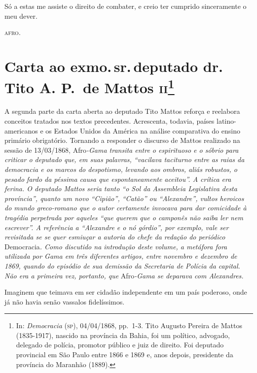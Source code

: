 Só a estas me assiste o direito de combater, e creio ter cumprido
sinceramente o meu dever.
\begin{flushright}
\textsc{afro}.
\end{flushright}
\chapter{Carta ao exmo.\,sr.\,deputado dr.\,Tito A. P.~de Mattos
\textsc{ii}\footnote{In: \emph{Democracia} (\textsc{sp}), 04/04/1868, pp.~1-3.
  Tito Augusto Pereira de Mattos (1835-1917), nascido na província da
  Bahia, foi um político, advogado, delegado de polícia, promotor
  público e juiz de direito. Foi deputado provincial em São Paulo entre
  1866 e 1869 e, anos depois, presidente da província do Maranhão
  (1889).}}

\begin{didascalia}
A segunda parte da carta aberta ao deputado Tito Mattos reforça e
reelabora conceitos tratados nos textos precedentes. Acrescenta,
todavia, países latino-americanos e os Estados Unidos da América na
análise comparativa do ensino primário obrigatório. Tornando a responder
o discurso de Mattos realizado na sessão de 13/03/1868, Afro\emph{-Gama
transita entre o espirituoso e o sóbrio para criticar o deputado que, em
suas palavras, ``vacilava taciturno entre as raias da democracia e
os marcos do despotismo, levando aos ombros, aliás robustos, o pesado
fardo da péssima causa que espontaneamente aceitou''. A crítica era
ferina. O deputado Mattos seria tanto ``o Sol da Assembleia Legislativa
desta província'', quanto um novo ``Cipião'', ``Catão'' ou ``Alexandre'',
vultos heroicos do mundo greco-romano que o autor certamente invocava
para dar comicidade à tragédia perpetrada por aqueles ``que querem que o
camponês não saiba ler nem escrever''. A referência a ``Alexandre e o nó
górdio'', por exemplo, vale ser revisitada se se quer esmiuçar a autoria
do chefe da redação do periódico} Democracia\emph{. Como discutido na
introdução deste volume, a metáfora fora utilizada por Gama em três
diferentes artigos, entre novembro e dezembro de 1869, quando do
episódio de sua demissão da Secretaria de Polícia da capital. Não era a
primeira vez, portanto, que} Afro\emph{-Gama se deparava com
Alexandres.}
\end{didascalia}



Imaginem que teimava em ser cidadão independente em um país poderoso,
onde já não havia senão vassalos fidelíssimos.

